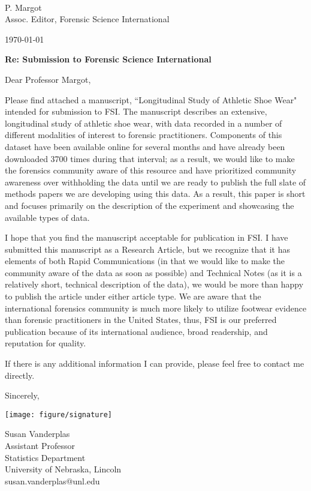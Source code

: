 \documentclass[11pt]{article}
\begin{document}
\hspace{1em}\\
P. Margot\\
Assoc. Editor, Forensic Science International\vspace{2em}

\today\\\vspace{1em}

{\bf Re: Submission to Forensic Science International}\\\vspace{2em}

Dear Professor Margot, \vspace{1em}

Please find attached a manuscript, ``Longitudinal Study of Athletic Shoe Wear" intended for submission to FSI.
The manuscript describes an extensive, longitudinal study of athletic shoe wear, with data recorded in a number of different modalities of interest to forensic practitioners. Components of this dataset have been available online for several months and have already been downloaded 3700 times during that interval; as a result, we would like to make the forensics community aware of this resource and have prioritized community awareness over withholding the data until we are ready to publish the full slate of methods papers we are developing using this data. As a result, this paper is short and focuses primarily on the description of the experiment and showcasing the available types of data.
\vspace{1em}

I hope that you find the manuscript acceptable for publication in FSI. I have submitted this manuscript as a Research Article, but we recognize that it has elements of both Rapid Communications (in that we would like to make the community aware of the data as soon as possible) and Technical Notes (as it is a relatively short, technical description of the data), we would be more than happy to publish the article under either article type. We are aware that the international forensics community is much more likely to utilize footwear evidence than forensic practitioners in the United States, thus, FSI is our preferred publication because of its international audience, broad readership, and reputation for quality. \vspace{1em}

If there is any additional information I can provide, please feel free to contact me directly. \vspace{1em}

Sincerely,\\
\begin{minipage}{.25\linewidth}
\vspace*{.5cm}
\texttt{[image: figure/signature]}
\vspace*{.5cm}
\end{minipage}

Susan Vanderplas\\
Assistant Professor\\
Statistics Department\\
University of Nebraska, Lincoln\\
susan.vanderplas@unl.edu
\end{document}
